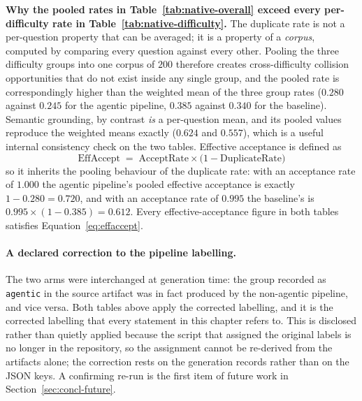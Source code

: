 \noindent\textbf{Why the pooled rates in Table~\ref{tab:native-overall} exceed every
per-difficulty rate in Table~\ref{tab:native-difficulty}.} The duplicate rate is not
a per-question property that can be averaged; it is a property of a \emph{corpus},
computed by comparing every question against every other. Pooling the three
difficulty groups into one corpus of $200$ therefore creates cross-difficulty
collision opportunities that do not exist inside any single group, and the pooled
rate is correspondingly higher than the weighted mean of the three group rates
($0.280$ against $0.245$ for the agentic pipeline, $0.385$ against $0.340$ for the
baseline). Semantic grounding, by contrast \emph{is} a per-question mean, and its
pooled values reproduce the weighted means exactly ($0.624$ and $0.557$), which is a
useful internal consistency check on the two tables. Effective acceptance is defined
as
\begin{equation}
\label{eq:effaccept}
\mathrm{EffAccept} \;=\; \mathrm{AcceptRate} \times
                         \bigl(1 - \mathrm{DuplicateRate}\bigr)
\end{equation}
so it inherits the pooling behaviour of the duplicate rate: with an acceptance rate
of $1.000$ the agentic pipeline's pooled effective acceptance is exactly
$1-0.280 = 0.720$, and with an acceptance rate of $0.995$ the baseline's is
$0.995 \times (1-0.385) = 0.612$. Every effective-acceptance figure in both tables
satisfies Equation~\ref{eq:effaccept}.

\paragraph{A declared correction to the pipeline labelling.} The two arms were
interchanged at generation time: the group recorded as \texttt{agentic} in the source
artifact was in fact produced by the non-agentic pipeline, and vice versa. Both
tables above apply the corrected labelling, and it is the corrected labelling that
every statement in this chapter refers to. This is disclosed rather than quietly
applied because the script that assigned the original labels is no longer in the
repository, so the assignment cannot be re-derived from the artifacts alone; the
correction rests on the generation records rather than on the JSON keys. A confirming
re-run is the first item of future work in Section~\ref{sec:concl-future}.

